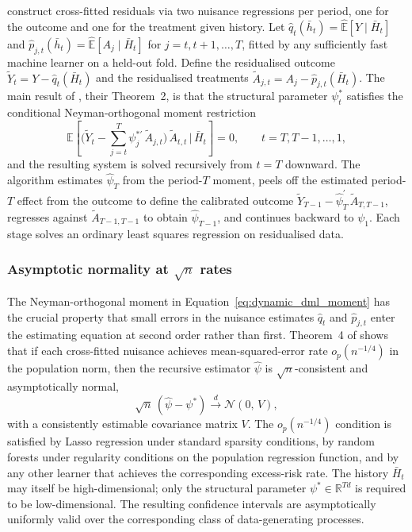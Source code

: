 \citet{lewisSyrgkanis2021dynamicDML} construct cross-fitted residuals via two nuisance regressions per period, one for the outcome and one for the treatment given history. Let $\hat q_t(\bar h_t) = \widehat{\mathbb{E}}[Y \mid \bar H_t]$ and $\hat p_{j,t}(\bar h_t) = \widehat{\mathbb{E}}[A_j \mid \bar H_t]$ for $j = t, t+1, \ldots, T$, fitted by any sufficiently fast machine learner on a held-out fold. Define the residualised outcome $\tilde Y_t = Y - \hat q_t(\bar H_t)$ and the residualised treatments $\tilde A_{j,t} = A_j - \hat p_{j,t}(\bar H_t)$. The main result of \citet{lewisSyrgkanis2021dynamicDML}, their Theorem~2, is that the structural parameter $\psi_t^*$ satisfies the conditional Neyman-orthogonal moment restriction
\begin{equation}
\mathbb{E}\!\left[\Big(\tilde Y_t - \sum_{j=t}^{T} \psi_j^{*\prime}\,\tilde A_{j,t}\Big)\,\tilde A_{t,t} \,\Big|\, \bar H_t\right] = 0, \qquad t = T, T-1, \ldots, 1,
\label{eq:dynamic_dml_moment}
\end{equation}
and the resulting system is solved recursively from $t = T$ downward. The algorithm estimates $\hat\psi_T$ from the period-$T$ moment, peels off the estimated period-$T$ effect from the outcome to define the calibrated outcome $\tilde Y_{T-1} - \hat\psi_T^{\prime}\,\tilde A_{T,T-1}$, regresses against $\tilde A_{T-1, T-1}$ to obtain $\hat\psi_{T-1}$, and continues backward to $\psi_1$. Each stage solves an ordinary least squares regression on residualised data.

\subsubsection*{Asymptotic normality at $\sqrt n$ rates}

The Neyman-orthogonal moment in Equation~\eqref{eq:dynamic_dml_moment} has the crucial property that small errors in the nuisance estimates $\hat q_t$ and $\hat p_{j,t}$ enter the estimating equation at second order rather than first. Theorem~4 of \citet{lewisSyrgkanis2021dynamicDML} shows that if each cross-fitted nuisance achieves mean-squared-error rate $o_p(n^{-1/4})$ in the population norm, then the recursive estimator $\hat\psi$ is $\sqrt n$-consistent and asymptotically normal,
\begin{equation}
\sqrt{n}\,(\hat\psi - \psi^*) \xrightarrow{d} \mathcal{N}(0,\, V),
\label{eq:dynamic_dml_clt}
\end{equation}
with a consistently estimable covariance matrix $V$. The $o_p(n^{-1/4})$ condition is satisfied by Lasso regression under standard sparsity conditions, by random forests under regularity conditions on the population regression function, and by any other learner that achieves the corresponding excess-risk rate. The history $\bar H_t$ may itself be high-dimensional; only the structural parameter $\psi^* \in \mathbb{R}^{Td}$ is required to be low-dimensional. The resulting confidence intervals are asymptotically uniformly valid over the corresponding class of data-generating processes.


